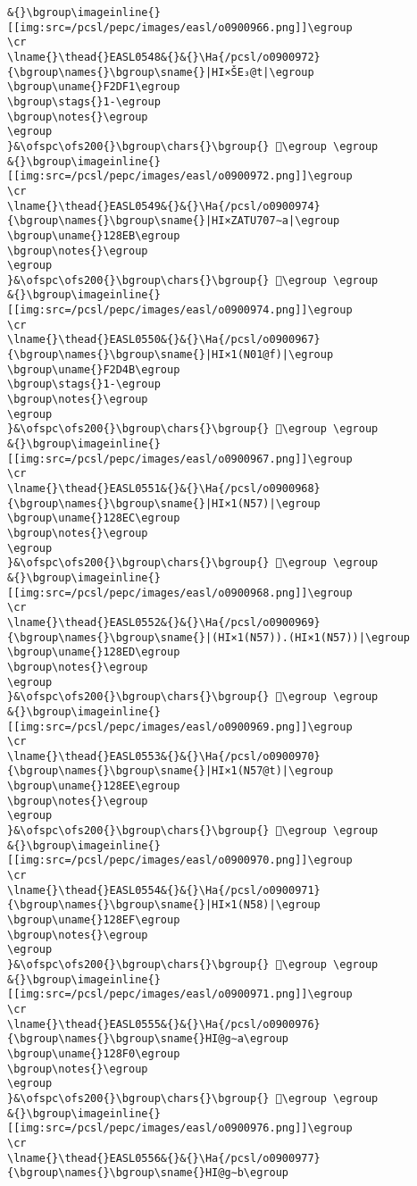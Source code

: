 \begin{verbatim}
&{}\bgroup\imageinline{}[[img:src=/pcsl/pepc/images/easl/o0900966.png]]\egroup
\cr
\lname{}\thead{}EASL0548&{}&{}\Ha{/pcsl/o0900972}{\bgroup\names{}\bgroup\sname{}|HI×ŠE₃@t|\egroup
\bgroup\uname{}F2DF1\egroup
\bgroup\stags{}1-\egroup
\bgroup\notes{}\egroup
\egroup
}&\ofspc\ofs200{}\bgroup\chars{}\bgroup{} 󲷱\egroup \egroup
&{}\bgroup\imageinline{}[[img:src=/pcsl/pepc/images/easl/o0900972.png]]\egroup
\cr
\lname{}\thead{}EASL0549&{}&{}\Ha{/pcsl/o0900974}{\bgroup\names{}\bgroup\sname{}|HI×ZATU707∼a|\egroup
\bgroup\uname{}128EB\egroup
\bgroup\notes{}\egroup
\egroup
}&\ofspc\ofs200{}\bgroup\chars{}\bgroup{} 𒣫\egroup \egroup
&{}\bgroup\imageinline{}[[img:src=/pcsl/pepc/images/easl/o0900974.png]]\egroup
\cr
\lname{}\thead{}EASL0550&{}&{}\Ha{/pcsl/o0900967}{\bgroup\names{}\bgroup\sname{}|HI×1(N01@f)|\egroup
\bgroup\uname{}F2D4B\egroup
\bgroup\stags{}1-\egroup
\bgroup\notes{}\egroup
\egroup
}&\ofspc\ofs200{}\bgroup\chars{}\bgroup{} 󲵋\egroup \egroup
&{}\bgroup\imageinline{}[[img:src=/pcsl/pepc/images/easl/o0900967.png]]\egroup
\cr
\lname{}\thead{}EASL0551&{}&{}\Ha{/pcsl/o0900968}{\bgroup\names{}\bgroup\sname{}|HI×1(N57)|\egroup
\bgroup\uname{}128EC\egroup
\bgroup\notes{}\egroup
\egroup
}&\ofspc\ofs200{}\bgroup\chars{}\bgroup{} 𒣬\egroup \egroup
&{}\bgroup\imageinline{}[[img:src=/pcsl/pepc/images/easl/o0900968.png]]\egroup
\cr
\lname{}\thead{}EASL0552&{}&{}\Ha{/pcsl/o0900969}{\bgroup\names{}\bgroup\sname{}|(HI×1(N57)).(HI×1(N57))|\egroup
\bgroup\uname{}128ED\egroup
\bgroup\notes{}\egroup
\egroup
}&\ofspc\ofs200{}\bgroup\chars{}\bgroup{} 𒣭\egroup \egroup
&{}\bgroup\imageinline{}[[img:src=/pcsl/pepc/images/easl/o0900969.png]]\egroup
\cr
\lname{}\thead{}EASL0553&{}&{}\Ha{/pcsl/o0900970}{\bgroup\names{}\bgroup\sname{}|HI×1(N57@t)|\egroup
\bgroup\uname{}128EE\egroup
\bgroup\notes{}\egroup
\egroup
}&\ofspc\ofs200{}\bgroup\chars{}\bgroup{} 𒣮\egroup \egroup
&{}\bgroup\imageinline{}[[img:src=/pcsl/pepc/images/easl/o0900970.png]]\egroup
\cr
\lname{}\thead{}EASL0554&{}&{}\Ha{/pcsl/o0900971}{\bgroup\names{}\bgroup\sname{}|HI×1(N58)|\egroup
\bgroup\uname{}128EF\egroup
\bgroup\notes{}\egroup
\egroup
}&\ofspc\ofs200{}\bgroup\chars{}\bgroup{} 𒣯\egroup \egroup
&{}\bgroup\imageinline{}[[img:src=/pcsl/pepc/images/easl/o0900971.png]]\egroup
\cr
\lname{}\thead{}EASL0555&{}&{}\Ha{/pcsl/o0900976}{\bgroup\names{}\bgroup\sname{}HI@g∼a\egroup
\bgroup\uname{}128F0\egroup
\bgroup\notes{}\egroup
\egroup
}&\ofspc\ofs200{}\bgroup\chars{}\bgroup{} 𒣰\egroup \egroup
&{}\bgroup\imageinline{}[[img:src=/pcsl/pepc/images/easl/o0900976.png]]\egroup
\cr
\lname{}\thead{}EASL0556&{}&{}\Ha{/pcsl/o0900977}{\bgroup\names{}\bgroup\sname{}HI@g∼b\egroup

\end{verbatim}
